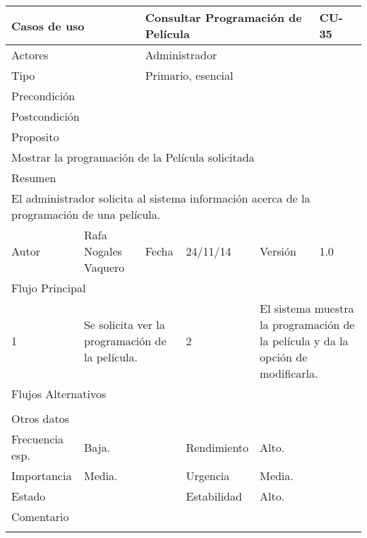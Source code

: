 \documentclass{article}
\begin{document}
\begin{table}[h]
\begin{tabular}{|l|l|l|l|l|l|}
\hline
\multicolumn{2}{|p{2cm}|}{Casos de uso}  & \multicolumn{3}{p{7cm}|}{Consultar Programación de Película} & CU-35 \\
\hline
\multicolumn{2}{|p{2cm}|}{Actores}       & \multicolumn{4}{p{8cm}|}{Administrador}        \\
\hline
\multicolumn{2}{|p{2cm}|}{Tipo}          & \multicolumn{4}{p{8cm}|}{Primario, esencial}        \\
\hline
\multicolumn{2}{|p{2cm}|}{Precondición}  & \multicolumn{4}{p{8cm}|}{}        \\
\hline
\multicolumn{2}{|p{2cm}|}{Postcondición} & \multicolumn{4}{p{8cm}|}{}        \\
\hline
\multicolumn{6}{|p{10cm}|}{Proposito}                                   \\
\hline
\multicolumn{6}{|p{10cm}|}{Mostrar la programación de la Película solicitada}                                            \\
\hline
\multicolumn{6}{|p{10cm}|}{Resumen}                                 \\
\hline
\multicolumn{6}{|p{10cm}|}{El administrador solicita al sistema información acerca de la programación de una película.}                                            \\
\hline
Autor         &       Rafa Nogales Vaquero        &  Fecha   &  24/11/14   &   Versión  & 1.0\\
\hline
\multicolumn{6}{|p{10cm}|}{Flujo Principal}\\
\hline
\multicolumn{1}{|p{1cm}|}{1} & \multicolumn{2}{p{3cm}}{Se solicita ver la programación de la película.} & \multicolumn{1}{|p{1cm}|}{2} & \multicolumn{2}{p{3cm}|}{El sistema muestra la programación de la película y da la opción de modificarla.}\\
\hline
\multicolumn{6}{|p{10cm}|}{Flujos Alternativos}\\
\hline
\multicolumn{1}{|p{1cm}}{} & \multicolumn{5}{|p{9cm}|}{}\\
\hline
\multicolumn{6}{|p{10cm}|}{Otros datos}\\
\hline
\multicolumn{1}{|p{2cm}|}{Frecuencia esp.} & \multicolumn{2}{p{3cm}}{Baja.} & \multicolumn{1}{|p{2cm}|}{Rendimiento} & \multicolumn{2}{p{3cm}|}{Alto.}\\
\hline
\multicolumn{1}{|p{2cm}|}{Importancia} & \multicolumn{2}{p{3cm}}{Media.} & \multicolumn{1}{|p{2cm}|}{Urgencia} & \multicolumn{2}{p{3cm}|}{Media.}\\
\hline
\multicolumn{1}{|p{2cm}|}{Estado} & \multicolumn{2}{p{3cm}}{} & \multicolumn{1}{|p{2cm}|}{Estabilidad} & \multicolumn{2}{p{3cm}|}{Alto.}\\
\hline
\multicolumn{6}{|p{10cm}|}{Comentario}\\
\hline
\multicolumn{6}{|p{10cm}|}{}\\
\hline
\end{tabular}
\end{table}
\end{document}
